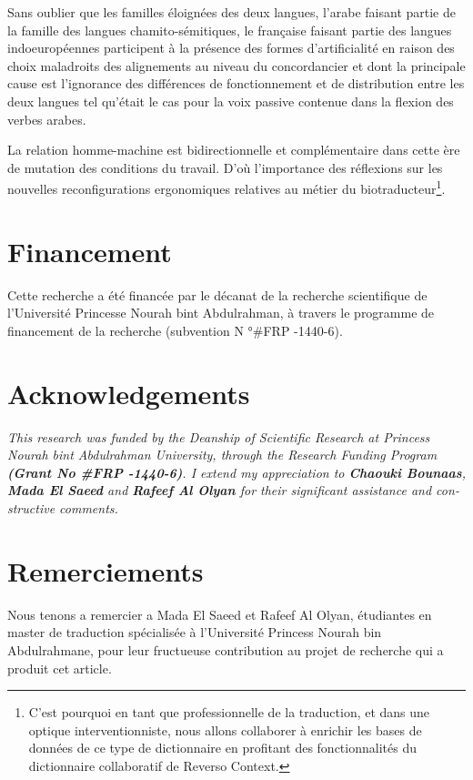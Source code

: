 \documentclass{textolivre}
\begin{document}
Sans oublier que les familles éloignées des deux langues, l’arabe faisant partie de la famille des langues chamito-sémitiques, le française faisant partie des langues indoeuropéennes participent à la présence des formes d’artificialité en raison des choix maladroits des alignements au niveau du concordancier et dont la principale cause est l’ignorance des différences de fonctionnement et de distribution entre les deux langues tel qu’était le cas pour la voix passive contenue dans la flexion des verbes arabes.

La relation homme-machine est bidirectionnelle et complémentaire dans cette ère de mutation des conditions du travail. D’où l’importance des réflexions sur les nouvelles reconfigurations ergonomiques relatives au métier du biotraducteur\footnote{C’est pourquoi en tant que professionnelle de la traduction, et dans une optique interventionniste, nous allons collaborer à enrichir les bases de données de ce type de dictionnaire en profitant des fonctionnalités du dictionnaire collaboratif de Reverso Context.}.

\section*{Financement}
Cette recherche a été financée par le décanat de la recherche scientifique de l’Université Princesse Nourah bint Abdulrahman, à travers le programme de financement de la recherche (subvention N °\#FRP -1440-6).

\section*{Acknowledgements}
\begin{english}
\textit{
This research was funded by the Deanship of Scientific Research at Princess Nourah bint Abdulrahman University, 
through the Research Funding Program \textbf{(Grant No \#FRP -1440-6)}. 
I extend my appreciation to \textbf{Chaouki Bounaas}, \textbf{Mada El Saeed} and \textbf{Rafeef Al Olyan}
for their significant assistance and constructive comments.
}
\end{english}


\section*{Remerciements}
Nous tenons a remercier a Mada El Saeed et Rafeef Al Olyan, étudiantes en master de traduction spécialisée à l’Université Princess Nourah bin Abdulrahmane, pour leur fructueuse contribution au projet de recherche qui a produit cet article.

\begin{portuguese}
\printbibliography[title={Références}]
\end{portuguese}
\end{document}
